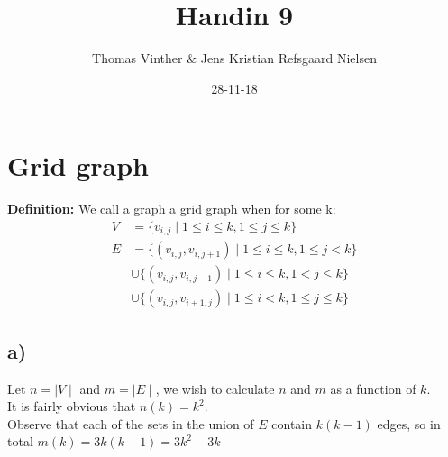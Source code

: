 \documentclass{article}
\theoremstyle{remark}
\numberwithin{equation}{section}
\begin{document}
	\author{Thomas Vinther \& Jens Kristian Refsgaard Nielsen}
	\title{Handin 9}
	\date{28-11-18}
	\maketitle
	\section{Grid graph}
	\textbf{Definition:} We call a graph a grid graph when for some k:
	\begin{align}
		V &= \{ v_{i,j} \mid 1\leq i\leq k,1\leq j\leq k \}\\
		E &= \{ (v_{i,j},v_{i,j+1}) \mid 1\leq i\leq k,1\leq j < k \} \nonumber\\
		&\cup \{ (v_{i,j},v_{i,j-1}) \mid 1\leq i\leq k,1 < j\leq k \} \\
		&\cup \{ (v_{i,j},v_{i+1,j}) \mid 1\leq i < k,1\leq j\leq k \} \nonumber
	\end{align}
	\subsection{a)}
	\noindent Let $n=\mid V\mid$ and $m=\mid E \mid$, we wish to calculate $n$ and $m$ as a function of $k$.\\
	It is fairly obvious that $n(k)=k^2$.\\
	Observe that each of the sets in the union of $E$ contain $k(k-1)$ edges, so in total $m(k) = 3k(k-1) = 3k^2-3k$\\
\end{document}
